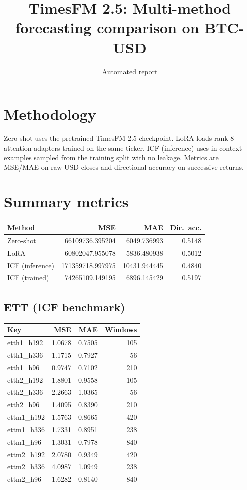 \documentclass[11pt]{article}
\begin{document}
\title{{TimesFM 2.5: Multi-method forecasting comparison on BTC-USD}}
\author{Automated report}
\maketitle

\section{Methodology}
Zero-shot uses the pretrained TimesFM 2.5 checkpoint. LoRA loads rank-8 attention adapters trained on the same ticker. ICF (inference) uses in-context examples sampled from the training split with no leakage. Metrics are MSE/MAE on raw USD closes and directional accuracy on successive returns.

\section{Summary metrics}
\begin{tabular}{lrrr}\hline
Method & MSE & MAE & Dir.~acc. \\\hline
Zero-shot & 66109736.395204 & 6049.736993 & 0.5148 \\
LoRA & 60802047.955078 & 5836.480938 & 0.5012 \\
ICF (inference) & 171359718.997975 & 10431.944445 & 0.4840 \\
ICF (trained) & 74265109.149195 & 6896.145429 & 0.5197 \\
\hline\end{tabular}

\subsection{ETT (ICF benchmark)}
\begin{tabular}{lrrr}\hline
Key & MSE & MAE & Windows \\\hline
etth1_h192 & 1.0678 & 0.7505 & 105 \\
etth1_h336 & 1.1715 & 0.7927 & 56 \\
etth1_h96 & 0.9747 & 0.7102 & 210 \\
etth2_h192 & 1.8801 & 0.9558 & 105 \\
etth2_h336 & 2.2663 & 1.0365 & 56 \\
etth2_h96 & 1.4095 & 0.8390 & 210 \\
ettm1_h192 & 1.5763 & 0.8665 & 420 \\
ettm1_h336 & 1.7331 & 0.8951 & 238 \\
ettm1_h96 & 1.3031 & 0.7978 & 840 \\
ettm2_h192 & 2.0780 & 0.9349 & 420 \\
ettm2_h336 & 4.0987 & 1.0949 & 238 \\
ettm2_h96 & 1.6282 & 0.8140 & 840 \\
\hline\end{tabular}
\end{document}
